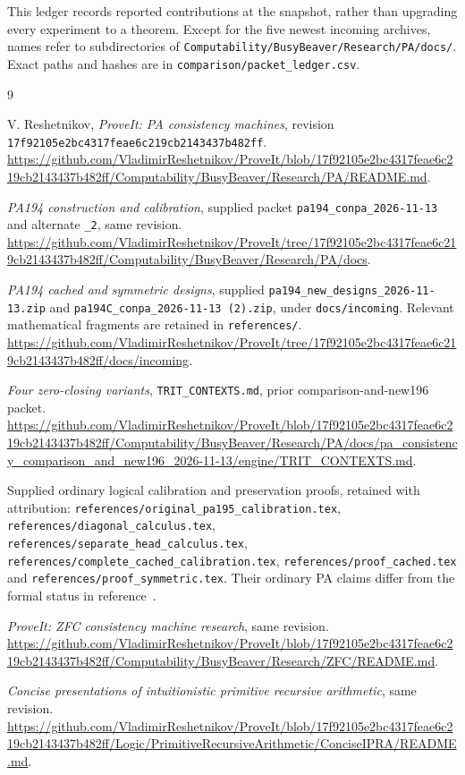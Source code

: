 \documentclass[11pt,letterpaper]{article}
\newcommand{\file}[1]{{\small\nolinkurl{#1}}}
\newcommand{\snapshot}{\texttt{17f92105e2bc4317feae6c219cb2143437b482ff}}
\begin{document}
This ledger records reported contributions at the snapshot, rather than
upgrading every experiment to a theorem. Except for the five newest
incoming archives, names refer to subdirectories of
\file{Computability/BusyBeaver/Research/PA/docs/}. Exact paths and hashes
are in \file{comparison/packet_ledger.csv}.



\clearpage
\begin{thebibliography}{9}
\raggedright
{} V. Reshetnikov, \emph{ProveIt: PA consistency machines},
revision \snapshot.
\url{https://github.com/VladimirReshetnikov/ProveIt/blob/17f92105e2bc4317feae6c219cb2143437b482ff/Computability/BusyBeaver/Research/PA/README.md}.

 \emph{PA194 construction and calibration},
supplied packet \file{pa194_conpa_2026-11-13} and alternate \file{_2},
same revision.
\url{https://github.com/VladimirReshetnikov/ProveIt/tree/17f92105e2bc4317feae6c219cb2143437b482ff/Computability/BusyBeaver/Research/PA/docs}.

 \emph{PA194 cached and symmetric designs},
supplied \file{pa194_new_designs_2026-11-13.zip} and
\file{pa194C_conpa_2026-11-13 (2).zip}, under \file{docs/incoming}.
Relevant mathematical fragments are retained in \file{references/}.
\url{https://github.com/VladimirReshetnikov/ProveIt/tree/17f92105e2bc4317feae6c219cb2143437b482ff/docs/incoming}.

 \emph{Four zero-closing variants},
\file{TRIT_CONTEXTS.md}, prior comparison-and-new196 packet.
\url{https://github.com/VladimirReshetnikov/ProveIt/blob/17f92105e2bc4317feae6c219cb2143437b482ff/Computability/BusyBeaver/Research/PA/docs/pa_consistency_comparison_and_new196_2026-11-13/engine/TRIT_CONTEXTS.md}.

 Supplied ordinary logical calibration and
preservation proofs, retained with attribution:
\file{references/original_pa195_calibration.tex},
\file{references/diagonal_calculus.tex},
\file{references/separate_head_calculus.tex},
\file{references/complete_cached_calibration.tex},
\file{references/proof_cached.tex} and
\file{references/proof_symmetric.tex}.
Their ordinary PA claims differ from the formal status in
reference~\cite{repo}.

 \emph{ProveIt: ZFC consistency machine research},
same revision.
\url{https://github.com/VladimirReshetnikov/ProveIt/blob/17f92105e2bc4317feae6c219cb2143437b482ff/Computability/BusyBeaver/Research/ZFC/README.md}.

 \emph{Concise presentations of intuitionistic primitive
recursive arithmetic}, same revision.
\url{https://github.com/VladimirReshetnikov/ProveIt/blob/17f92105e2bc4317feae6c219cb2143437b482ff/Logic/PrimitiveRecursiveArithmetic/ConciseIPRA/README.md}.
\end{thebibliography}
\end{document}
